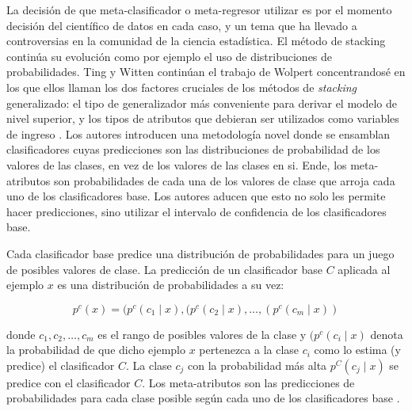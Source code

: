 La decisión de que meta-clasificador o meta-regresor utilizar es por el momento decisión del científico de datos en cada caso, y un tema que ha llevado a controversias en la comunidad de la ciencia estadística.  El método de stacking continúa su evolución como por ejemplo el uso de distribuciones de probabilidades. Ting y Witten continúan el trabajo de Wolpert concentrandosé en los que ellos llaman los dos factores cruciales de los métodos de \emph{stacking} generalizado: el tipo de generalizador más conveniente para derivar el modelo de nivel superior, y los tipos de atributos que debieran ser utilizados como variables de ingreso \cite{tingwitten}. Los autores introducen una metodología novel donde se ensamblan clasificadores cuyas predicciones son las distribuciones de probabilidad de los valores de las clases, en vez de los valores de las clases en si. Ende, los meta-atributos son probabilidades de cada una de los valores de clase que arroja cada uno de los clasificadores base. Los autores aducen que esto no solo les permite hacer predicciones, sino utilizar el intervalo de confidencia de los clasificadores base.

Cada clasificador base predice una distribución de probabilidades para un juego de posibles valores de clase. La predicción de un clasificador base $C$ aplicada al ejemplo $x$ es una distribución de probabilidades a su vez:

\[ p^c(x) = (p^c(c_1 \mid x), (p^c(c_2 \mid x), \ldots, (p^c(c_m \mid x)) \]

donde ${c_{1}, c_{2}, \ldots, c_m}$ es el rango de posibles valores de la clase y $(p^c(c_i \mid x)$ denota la probabilidad de que dicho ejemplo $x$ pertenezca a la clase $c_i$ como lo estima (y predice) el clasificador $C$. La clase $c_j$ con la probabilidad más alta $p^C(c_j \mid x)$ se predice con el clasificador $C$. Los meta-atributos son las predicciones de probabilidades para cada clase posible según cada uno de los clasificadores base \cite{DzeroskiZenko}.
